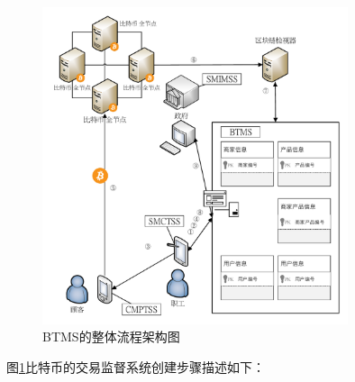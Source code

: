 	\begin{figure}[!htbp]
		\centering
		\includegraphics[width = 0.8\textwidth]{fig4.pdf}
		\caption{BTMS的整体流程架构图}\label{fig4}
	\end{figure}

	图\ref{fig4}比特币的交易监督系统创建步骤描述如下：

